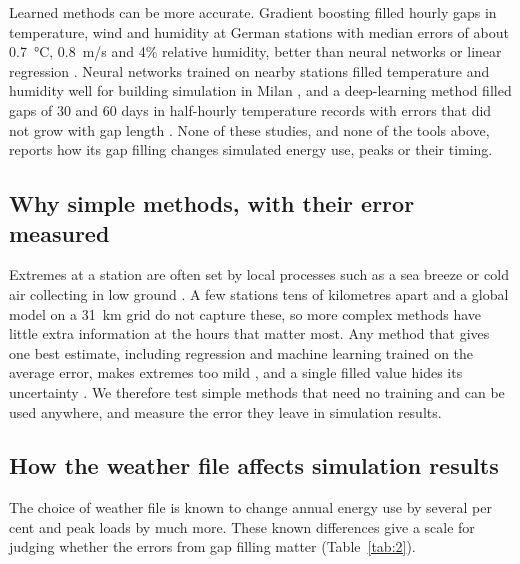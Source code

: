Learned methods can be more accurate. Gradient boosting filled hourly gaps in temperature, wind and humidity at German stations with median errors of about 0.7~°C, 0.8~m/s and 4\% relative humidity, better than neural networks or linear regression \citep{korner2018}. Neural networks trained on nearby stations filled temperature and humidity well for building simulation in Milan \citep{meshkinkiya2020}, and a deep-learning method filled gaps of 30 and 60 days in half-hourly temperature records with errors that did not grow with gap length \citep{xie2021}. None of these studies, and none of the tools above, reports how its gap filling changes simulated energy use, peaks or their timing.

\subsection{Why simple methods, with their error measured}\label{sec:2.3}

Extremes at a station are often set by local processes such as a sea breeze or cold air collecting in low ground \citep{miller2003,daly2010}. A few stations tens of kilometres apart and a global model on a 31~km grid do not capture these, so more complex methods have little extra information at the hours that matter most. Any method that gives one best estimate, including regression and machine learning trained on the average error, makes extremes too mild \citep{begueria2019}, and a single filled value hides its uncertainty \citep{little2019}. We therefore test simple methods that need no training and can be used anywhere, and measure the error they leave in simulation results.

\subsection{How the weather file affects simulation results}\label{sec:2.4}

The choice of weather file is known to change annual energy use by several per cent and peak loads by much more. These known differences give a scale for judging whether the errors from gap filling matter (Table~\ref{tab:2}).

